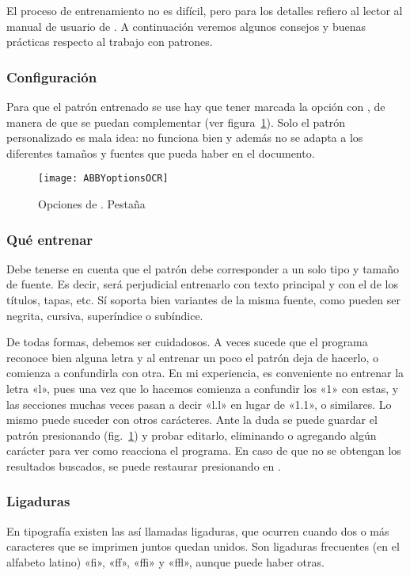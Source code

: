 \documentclass[%
	a5paper,
	10pt,
	twoside,
	openright,
	final,
]{memoir}
\begin{document}
	El proceso de entrenamiento no es difícil, pero para los detalles refiero al lector al manual de usuario de \abby. A continuación veremos algunos consejos y buenas prácticas respecto al trabajo con patrones.

	\subsubsection{Configuración} Para que el patrón entrenado se use hay que tener marcada la opción  con , de manera de que se puedan complementar (ver figura~\ref{fig:ABBYoptionsOCR}). Solo el patrón personalizado es mala idea: no funciona bien y además no se adapta a los diferentes tamaños y fuentes que pueda haber en el documento.

	\begin{figure}
		\centering
		\texttt{[image: ABBYoptionsOCR]}
		\caption[Opciones de \abby. Pestaña OCR]{Opciones de \abby. Pestaña \label{fig:ABBYoptionsOCR}}
	\end{figure}

	\subsubsection{Qué entrenar} Debe tenerse en cuenta que el patrón debe corresponder a un solo tipo y tamaño de fuente. Es decir, será perjudicial entrenarlo con texto principal y con el de los títulos, tapas, etc. Sí soporta bien variantes de la misma fuente, como pueden ser negrita, cursiva, superíndice o subíndice.

	De todas formas, debemos ser cuidadosos. A veces sucede que el programa reconoce bien alguna letra y al entrenar un poco el patrón deja de hacerlo, o comienza a confundirla con otra. En mi experiencia, es conveniente no entrenar la letra «l», pues una vez que lo hacemos comienza a confundir los «1» con estas, y las secciones muchas veces pasan a decir «l.l» en lugar de «1.1», o similares. Lo mismo puede suceder con otros carácteres. Ante la duda se puede guardar el patrón presionando  (fig.~\ref{fig:ABBYoptionsOCR}) y probar editarlo, eliminando o agregando algún carácter para ver como reacciona el programa. En caso de que no se obtengan los resultados buscados, se puede restaurar presionando en .

	\subsubsection{Ligaduras} En tipografía existen las así llamadas ligaduras, que ocurren cuando dos o más caracteres que se imprimen juntos quedan unidos. Son ligaduras frecuentes (en el alfabeto latino) «fi», «ff», «ffi» y «ffl», aunque puede haber otras.
\end{document}
